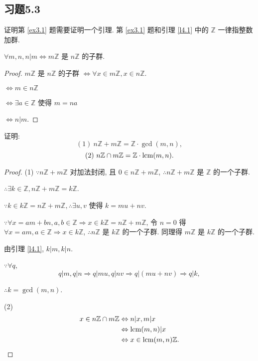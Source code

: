 \documentclass[color=black,device=normal,lang=cn,mode=geye]{elegantnote}
\begin{document}
\subsection{习题5.3}
证明第 \ref{ex3.1} 题需要证明一个引理. 第 \ref{ex3.1} 题和引理 \ref{l4.1} 中的 $\mathbb{Z}$ 一律指整数加群.
\begin{lemma}\label{l4.1}
    $\forall m,n,n|m\Leftrightarrow m\mathbb{Z}$ 是 $n\mathbb{Z}$ 的子群.
\end{lemma}
\begin{proof}
    $m\mathbb{Z}$ 是 $n\mathbb{Z}$ 的子群 $\Leftrightarrow\forall x\in m\mathbb{Z},x\in n\mathbb{Z}$.

    $\Leftrightarrow m\in n\mathbb{Z}$

    $\Leftrightarrow\exists a\in\mathbb{Z}$ 使得 $m=na$

    $\Leftrightarrow n|m$.
\end{proof}
\begin{exercise}\label{ex3.1}
    证明:
    \[(1)\ n\mathbb{Z}+m\mathbb{Z}=\mathbb{Z}\cdot\gcd(m,n),\]
    \[(2)\ n\mathbb{Z}\cap m\mathbb{Z}=\mathbb{Z}\cdot\operatorname{lcm} (m,n).\]
\end{exercise}
\begin{proof}
    (1) $\because n\mathbb{Z}+m\mathbb{Z}$ 对加法封闭, 且 $0\in n\mathbb{Z}+m\mathbb{Z}$, $\therefore n\mathbb{Z}+m\mathbb{Z}$ 是 $\mathbb{Z}$ 的一个子群.
    
    $\therefore\exists k\in\mathbb{Z},n\mathbb{Z}+m\mathbb{Z}=k\mathbb{Z}$.

    $\because k\in k\mathbb{Z}=n\mathbb{Z}+m\mathbb{Z},\therefore\exists u,v$ 使得 $k=mu+nv$.

    $\because\forall x=am+bn,a,b\in\mathbb{Z}\Rightarrow x\in k\mathbb{Z}=n\mathbb{Z}+m\mathbb{Z}$, 令 $n=0$ 得 $\forall x=am,a\in\mathbb{Z}\Rightarrow x\in k\mathbb{Z}$, $\therefore n\mathbb{Z}$ 是 $k\mathbb{Z}$ 的一个子群. 同理得 $m\mathbb{Z}$ 是 $k\mathbb{Z}$ 的一个子群.

    由引理 \ref{l4.1}, $k|m,k|n$.

    $\because\forall q$,
    \[q|m,q|n\Rightarrow q|mu,q|nv\Rightarrow q|(mu+nv)\Rightarrow q|k,\]

    $\therefore k=\gcd(m,n)$.

    (2)
    \begin{align*}
        x\in n\mathbb{Z}\cap m\mathbb{Z} & \Leftrightarrow n|x,m|x \\
        & \Leftrightarrow\operatorname{lcm} (m,n)|x \\
        & \Leftrightarrow x\in\operatorname{lcm} (m,n)\mathbb{Z}.
    \end{align*}
\end{proof}
\end{document}

